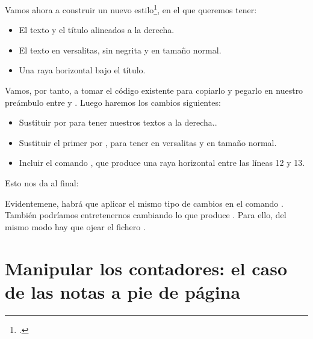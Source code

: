 Vamos ahora a construir un nuevo estilo\footcite[Nos inspiramos aquí en el estilo de la clase ][]{bredele}, en el que queremos tener:
\begin{itemize}
\item El texto  y el título alineados a la derecha.
\item El texto  en versalitas, sin negrita y en tamaño normal.
\item Una raya horizontal bajo el título.
\end{itemize}

Vamos, por tanto, a tomar el código existente para copiarlo y pegarlo en nuestro preámbulo entre  y . Luego haremos los cambios siguientes:

\begin{itemize}
\item Sustituir  por  para tener nuestros textos a la derecha..
\item Sustituir el primer  por , para tener  en versalitas y en tamaño normal.
\item Incluir el comando , que produce una raya horizontal entre las líneas 12 y 13.
\end{itemize}

Esto nos da al final:

\begin{latexcode}
\makeatletter
\def\@makechapterhead#1{%
  \vspace*{50\p@}%
  {\parindent \z@ \raggedleft \normalfont
    \ifnum \c@secnumdepth >\m@ne
      \if@mainmatter
       \scshape \@chapapp\space \thechapter
        \par\nobreak
        \vskip 20\p@
      \fi
    \fi
    \interlinepenalty\@M
    \Huge \bfseries #1\par\nobreak
    \hrulefill
    \vskip 40\p@
  }}
\makeatother
\end{latexcode}

Evidentemene, habrá que aplicar el mismo tipo de cambios en el comando . También podríamos entretenernos cambiando lo que produce . Para ello, del mismo modo hay que ojear el fichero .

\section[Manipular los contadores]{Manipular los contadores: el caso de las notas a pie de página}\label{manipcompteurs}

